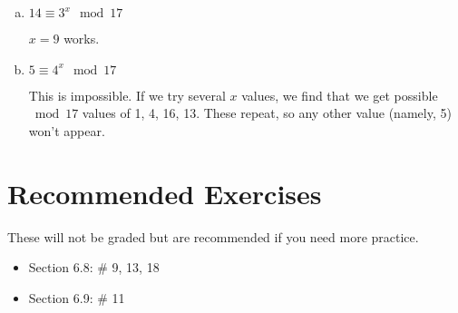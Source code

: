 \documentclass[12pt]{amsart}
\theoremstyle{plain}
\theoremstyle{definition}
\begin{document}
\begin{enumerate}[1.]
		\begin{enumerate}[a.]
			\item $14 \equiv 3^x \mod 17$
			\begin{framed}
			$x = 9$ works.
			\end{framed}
			\newpage \item $5 \equiv 4^x \mod 17$
			\begin{framed}
			This is impossible.  If we try several $x$ values, we find that we get possible $\bmod 17$ values of 1, 4, 16, 13.  These repeat, so any other value (namely, 5) won't appear.
			\end{framed}
		\end{enumerate}
\end{enumerate}


\section{Recommended Exercises}
\noindent These will not be graded but are recommended if you need more practice.
\begin{itemize}
	\item Section 6.8: \# 9, 13, 18
	\item Section 6.9: \# 11
\end{itemize}
	
\end{document}
